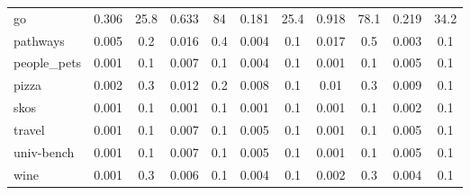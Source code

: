 {\begin{table*}[h]
\begin{tabular}{| l | c  c | c  c | c  c | c  c | c  c |}
go                          & 0.306 & 25.8 & 0.633 & 84  & 0.181 & 25.4  & 0.918 & 78.1 & 0.219 & 34.2  \\
pathways                    & 0.005 & 0.2  & 0.016 & 0.4 & 0.004 & 0.1   & 0.017 & 0.5  & 0.003 & 0.1   \\
people\_pets                & 0.001 & 0.1  & 0.007 & 0.1 & 0.004 & 0.1   & 0.001 & 0.1  & 0.005 & 0.1   \\
pizza                       & 0.002 & 0.3  & 0.012 & 0.2 & 0.008 & 0.1   & 0.01  & 0.3  & 0.009 & 0.1   \\
skos                        & 0.001 & 0.1  & 0.001 & 0.1 & 0.001 & 0.1   & 0.001 & 0.1  & 0.002 & 0.1   \\
travel                      & 0.001 & 0.1  & 0.007 & 0.1 & 0.005 & 0.1   & 0.001 & 0.1  & 0.005 & 0.1   \\
univ-bench                  & 0.001 & 0.1  & 0.007 & 0.1 & 0.005 & 0.1   & 0.001 & 0.1  & 0.005 & 0.1   \\
wine                        & 0.001 & 0.3  & 0.006 & 0.1 & 0.004 & 0.1   & 0.002 & 0.3  & 0.004 & 0.1  \\
    \hline
  \end{tabular}
\end{table*}
}

